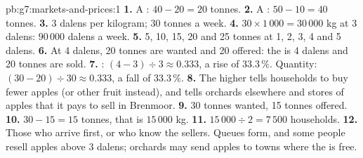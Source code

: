 \begin{solution}{pb:g7:markets-and-prices:1}
\textbf{1.} A : $40 - 20 = 20$ tonnes.
\textbf{2.} A : $50 - 10 = 40$ tonnes.
\textbf{3.} 3 dalens per kilogram; 30 tonnes a week.
\textbf{4.} $30 \times 1\,000 = 30\,000$ kg at 3 dalens: $90\,000$ dalens a week.
\textbf{5.} 5, 10, 15, 20 and 25 tonnes at 1, 2, 3, 4 and 5 dalens.
\textbf{6.} At 4 dalens, 20 tonnes are wanted and 20 offered: the  is 4 dalens and 20
tonnes are sold.
\textbf{7.} : $(4 - 3) \div 3 \approx 0.333$, a rise of $33.3\,\%$. Quantity: $(30 - 20)
\div 30 \approx 0.333$, a fall of $33.3\,\%$.
\textbf{8.} The higher  tells households to buy fewer apples (or other fruit instead), and
tells orchards elsewhere and stores of apples that it pays to sell in Brenmoor.
\textbf{9.} 30 tonnes wanted, 15 tonnes offered.
\textbf{10.} $30 - 15 = 15$ tonnes, that is $15\,000$ kg.
\textbf{11.} $15\,000 \div 2 = 7\,500$ households.
\textbf{12.} Those who arrive first, or who know the sellers. Queues form, and some people resell
apples above 3 dalens; orchards may send apples to towns where the  is free.
\end{solution}
